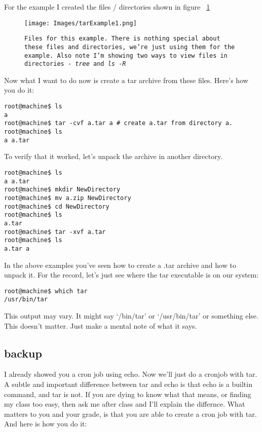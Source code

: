 \documentclass[12pt,a4paper]{article}
\begin{document}
For the example I created the files / directories shown in figure
~\ref{fig:tarExample1}

\begin{figure}[h]
\centering
	\texttt{[image: Images/tarExample1.png]}
	\caption{{\small \texttt{Files for this example. There is nothing special about these files
and directories, we're just using them for the example. Also note I'm showing
two ways to view files in directories - \textit{tree} and \textit{ ls -R}}}}
	\label{fig:tarExample1}
\end{figure}


Now what I want to do now is create a tar archive from these files. Here's how
you do it:

\begin{lstlisting}[style=term]
root@machine$ ls
a
root@machine$ tar -cvf a.tar a # create a.tar from directory a. 
root@machine$ ls 
a a.tar
\end{lstlisting}

To verify that it worked, let's unpack the archive in another directory.

\begin{lstlisting}[style=term]
root@machine$ ls
a a.tar
root@machine$ mkdir NewDirectory
root@machine$ mv a.zip NewDirectory
root@machine$ cd NewDirectory
root@machine$ ls
a.tar
root@machine$ tar -xvf a.tar
root@machine$ ls
a.tar a 
\end{lstlisting}

In the above examples you've seen how to create a .tar archive and how to unpack
it. For the record, let's just see where the tar executable is on our system:

\begin{lstlisting}[style=term]
root@machine$ which tar
/usr/bin/tar
\end{lstlisting}

This output may vary. It might say `/bin/tar' or `/usr/bin/tar' or something
else. This doesn't matter. Just make a mental note of what it says.

\subsection{backup}

I already showed you a cron job using echo. Now we'll just do a cronjob with
tar. A subtle and important difference between tar and echo is that echo is a
builtin command, and tar is not. If you are dying to know what that means, or
finding my class too easy, then ask me after class and I'll explain the
differnce. What matters to you and your grade, is that you are able to create a
cron job with tar. And here is how you do it:
\end{document}
